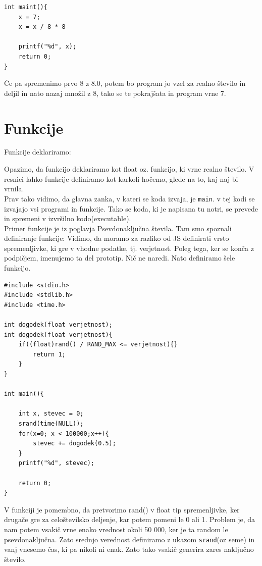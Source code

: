 \documentclass[a4paper, 12pt]{article}
\begin{document}
\begin{lstlisting}
int maint(){	
	x = 7;
	x = x / 8 * 8
	
	printf("%d", x);
	return 0;
}
\end{lstlisting}
Če pa spremenimo prvo 8 z 8.0, potem bo program jo vzel za realno število in deljil in nato nazaj množil z 8, tako se te pokrajšata in program vrne 7.
\section{Funkcije}

Funkcije deklariramo:\

{\centering{}\par}

Opazimo, da funkcijo deklariramo kot float oz. funkcijo, ki vrne realno število. V resnici lahko funkcije definiramo kot karkoli hočemo, glede na to, kaj naj bi vrnila.\\
Prav tako vidimo, da glavna zanka, v kateri se koda izvaja, je \texttt{main}. v tej kodi se izvajajo vsi programi in funkcije. Tako se koda, ki je napisana tu notri, se prevede in spremeni v izvršilno kodo(executable).\\
\newpage
Primer funkcije je iz poglavja Psevdonaključna števila. Tam smo spoznali definiranje funkcije:
 Vidimo, da moramo za razliko od JS definirati vrsto spremenljivke, ki gre v vhodne podatke, tj. verjetnost. Poleg tega, ker se konča z podpičjem, imenujemo ta del prototip. Nič ne naredi. Nato definiramo šele funkcijo.

\begin{lstlisting}
#include <stdio.h>
#include <stdlib.h>
#include <time.h>

int dogodek(float verjetnost);
int dogodek(float verjetnost){
	if((float)rand() / RAND_MAX <= verjetnost){}
		return 1;
	}
}

int main(){

	int x, stevec = 0;
	srand(time(NULL));
	for(x=0; x < 100000;x++){
		stevec += dogodek(0.5);
	}
	printf("%d", stevec);

	return 0;
}
\end{lstlisting}

V funkciji je pomembno, da pretvorimo rand() v float tip spremenljivke, ker drugače gre za celoštevilsko deljenje, kar potem pomeni le 0 ali 1. Problem je, da nam potem vsakič vrne enako vrednost okoli 50 000, ker je ta random le psevdonaključna. Zato srednjo verednost definiramo z ukazom \texttt{srand}(oz seme) in vanj vnesemo čas, ki pa nikoli ni enak. Zato tako vsakič generira zares naključno število.\
\end{document}
